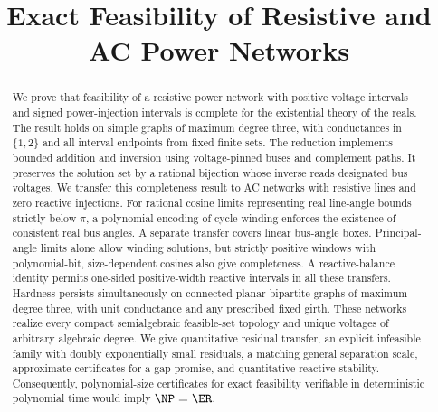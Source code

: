 \documentclass[11pt]{article}
\title{Exact Feasibility of Resistive and AC Power Networks}
\author{}
\date{}
\begin{document}
\maketitle
\begin{abstract}
We prove that feasibility of a resistive power network with positive voltage
intervals and signed power-injection intervals is complete for the existential
theory of the reals. The result holds on simple graphs of maximum degree three,
with conductances in $\{1,2\}$ and all interval endpoints from fixed finite sets.
The reduction implements bounded addition and inversion using voltage-pinned
buses and complement paths. It preserves the solution set by a rational
bijection whose inverse reads designated bus voltages. We transfer this
completeness result to AC networks with resistive lines and zero reactive
injections. For rational cosine limits representing real line-angle bounds
strictly below $\pi$, a polynomial encoding of cycle winding enforces the
existence of consistent real bus angles. A separate transfer covers linear
bus-angle boxes. Principal-angle limits alone allow winding solutions, but
strictly positive windows with polynomial-bit, size-dependent cosines also
give completeness. A reactive-balance identity permits one-sided
positive-width reactive intervals in all these transfers. Hardness persists
simultaneously on connected planar bipartite graphs of maximum degree three,
with unit conductance and any prescribed fixed girth. These networks realize
every compact semialgebraic feasible-set topology and unique voltages of
arbitrary algebraic degree. We give quantitative residual transfer, an
explicit infeasible family with doubly exponentially small residuals, a
matching general separation scale, approximate certificates for a gap
promise, and quantitative reactive stability. Consequently,
polynomial-size certificates for exact
feasibility verifiable in deterministic polynomial time would imply
$\NP=\ER$.
\end{abstract}








\end{document}
